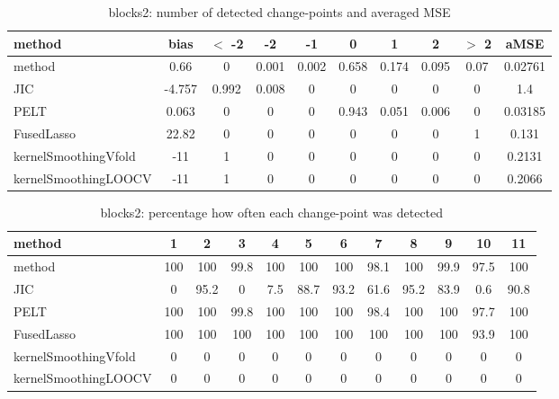 \begin{table}[ht]
\centering
\begin{tabular}{l|c|ccccccc|c}
  \hline
method & bias & $<$ -2 & -2 & -1 & 0 & 1 & 2 & $>$ 2 & aMSE \\ 
  \hline
method &  0.66 &     0 & 0.001 & 0.002 & 0.658 & 0.174 & 0.095 &  0.07 & 0.02761 \\ 
  JIC & -4.757 & 0.992 & 0.008 &     0 &     0 &     0 &     0 &     0 &   1.4 \\ 
  PELT & 0.063 &     0 &     0 &     0 & 0.943 & 0.051 & 0.006 &     0 & 0.03185 \\ 
  FusedLasso & 22.82 &     0 &     0 &     0 &     0 &     0 &     0 &     1 & 0.131 \\ 
  kernelSmoothingVfold &   -11 &     1 &     0 &     0 &     0 &     0 &     0 &     0 & 0.2131 \\ 
  kernelSmoothingLOOCV &   -11 &     1 &     0 &     0 &     0 &     0 &     0 &     0 & 0.2066 \\ 
   \hline
\end{tabular}
\caption{blocks2: number of detected change-points and averaged MSE} 
\label{tab:blocks2Njumps}
\end{table}
\begin{table}[ht]
\centering
\begin{tabular}{l|ccccccccccc}
  \hline
method & 1 & 2 & 3 & 4 & 5 & 6 & 7 & 8 & 9 & 10 & 11 \\ 
  \hline
method &    100 &    100 &   99.8 &    100 &    100 &    100 &   98.1 &    100 &   99.9 &   97.5 &    100 \\ 
  JIC &      0 &   95.2 &      0 &    7.5 &   88.7 &   93.2 &   61.6 &   95.2 &   83.9 &    0.6 &   90.8 \\ 
  PELT &    100 &    100 &   99.8 &    100 &    100 &    100 &   98.4 &    100 &    100 &   97.7 &    100 \\ 
  FusedLasso &    100 &    100 &    100 &    100 &    100 &    100 &    100 &    100 &    100 &   93.9 &    100 \\ 
  kernelSmoothingVfold &      0 &      0 &      0 &      0 &      0 &      0 &      0 &      0 &      0 &      0 &      0 \\ 
  kernelSmoothingLOOCV &      0 &      0 &      0 &      0 &      0 &      0 &      0 &      0 &      0 &      0 &      0 \\ 
   \hline
\end{tabular}
\caption{blocks2: percentage how often each change-point was detected} 
\label{tab:blocks2Detections}
\end{table}
